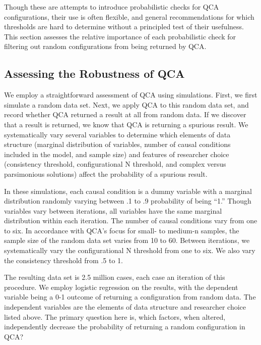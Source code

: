 \documentclass[12pt]{article}
\begin{document}
{{{{Though these are attempts to introduce probabilistic checks for QCA configurations, their use is often flexible, and general recommendations for which thresholds are hard to determine without a principled test of their usefulness. This section assesses the relative importance of each probabilistic check for filtering out random configurations from being returned by QCA. 

\subsection{Assessing the Robustness of QCA}

We employ a straightforward assessment of QCA using simulations. First, we first simulate a random data set. Next, we apply QCA to this random data set, and record whether QCA returned a result at all from random data. If we discover that a result is returned, we know that QCA is returning a spurious result. We systematically vary several variables to determine which elements of data structure (marginal distribution of variables, number of causal conditions included in the model, and sample size) and features of researcher choice (consistency threshold, configurational N threshold, and complex versus parsimonious solutions) affect the probability of a spurious result.  %

In these simulations, each causal condition is a dummy variable with a marginal distribution randomly varying between .1 to .9 probability of being ``1.'' Though variables vary between iterations, all variables have the same marginal distribution within each iteration. The number of causal conditions vary from one to six. In accordance with QCA's focus for small- to medium-n samples, the sample size of the random data set varies from 10 to 60. Between iterations, we systematically vary the configurational N threshold from one to six. We also vary the consistency threshold from .5 to 1.

The resulting data set is 2.5 million cases, each case an iteration of this procedure. We employ logistic regression on the results, with the dependent variable being a 0-1 outcome of returning a configuration from random data. The independent variables are the elements of data structure and researcher choice listed above. The primary question here is, which factors, when altered, independently decrease the probability of returning a random configuration in QCA?

}}}}
\end{document}
